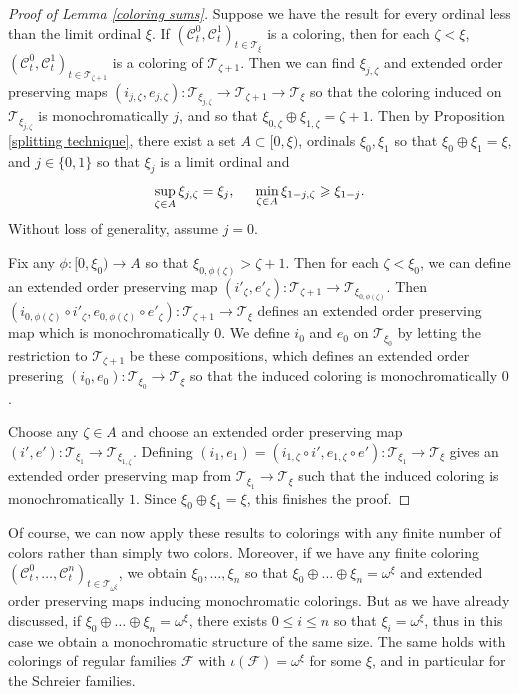 \documentclass[12pt]{amsart}
\theoremstyle{definition}
\newcommand{\ccc}{\mathcal{C}}
\newcommand{\fff}{\mathcal{F}}
\newcommand{\ttt}{\mathcal{T}}
\begin{document}
\begin{proof}[Proof of Lemma \ref{coloring sums}]
Suppose we have the result for every ordinal less than the limit ordinal $\xi$.  If $(\ccc^0_t, \ccc^1_t)_{t\in \ttt_\xi}$ is a coloring, then for each $\zeta<\xi$, $(\ccc^0_t, \ccc^1_t)_{t\in \ttt_{\zeta+1}}$ is a coloring of $\ttt_{\zeta+1}$.  Then we can find $\xi_{j, \zeta}$ and extended order preserving maps $(i_{j, \zeta}, e_{j, \zeta}):\ttt_{\xi_{j, \zeta}}\to \ttt_{\zeta+1}\to \ttt_\xi$ so that the coloring induced on $\ttt_{\xi_{j, \zeta}}$ is monochromatically $j$, and so that $\xi_{0, \zeta}\oplus \xi_{1, \zeta}=\zeta+1$.  Then by Proposition \ref{splitting technique}, there exist a set $A\subset [0, \xi)$, ordinals $\xi_0, \xi_1$ so that $\xi_0\oplus \xi_1=\xi$, and $j\in \{0,1\}$ so that $\xi_j$ is a limit ordinal and $$\sup_{\zeta\in A} \xi_{j, \zeta}=\xi_j, \hspace{5mm} \min_{\zeta\in A}\xi_{1-j, \zeta}\geqslant \xi_{1-j}.$$  Without loss of generality, assume $j=0$.  

Fix any $\phi:[0, \xi_0)\to A$ so that $\xi_{0,\phi(\zeta)}>\zeta+1$.  Then for each $\zeta<\xi_0$, we can define an extended order preserving map $(i'_\zeta, e'_\zeta):\ttt_{\zeta+1}\to \ttt_{\xi_{0,\phi(\zeta)}}$.  Then $(i_{0, \phi(\zeta)}\circ i'_\zeta, e_{0, \phi(\zeta)}\circ e'_\zeta):\ttt_{\zeta+1}\to \ttt_\xi$ defines an extended order preserving map which is monochromatically $0$.  We define $i_0$ and $e_0$ on $\ttt_{\xi_0}$ by letting the restriction to $\ttt_{\zeta+1}$ be these compositions, which defines an extended order presering $(i_0, e_0):\ttt_{\xi_0}\to \ttt_\xi$ so that the induced coloring is monochromatically $0$.  

Choose any $\zeta\in A$ and choose an extended order preserving map $(i', e'):\ttt_{\xi_1}\to \ttt_{\xi_{1,\zeta}}$.  Defining $(i_1, e_1)= ( i_{1, \zeta}\circ i', e_{1, \zeta}\circ e'):\ttt_{\xi_1}\to \ttt_\xi$ gives an extended order preserving map from $\ttt_{\xi_1}\to \ttt_\xi$ such that the induced coloring is monochromatically $1$.  Since $\xi_0\oplus \xi_1=\xi$, this finishes the proof.  




  






\end{proof}





Of course, we can now apply these results to colorings with any finite number of colors rather than simply two colors.  Moreover, if we have any finite coloring $(\ccc^0_t, \ldots, \ccc^n_t)_{t\in \ttt_{\omega^\xi}}$, we obtain $\xi_0, \ldots, \xi_n$ so that $\xi_0\oplus\ldots \oplus \xi_n= \omega^\xi$ and extended order preserving maps inducing monochromatic colorings.  But as we have already discussed, if $\xi_0\oplus \ldots \oplus \xi_n= \omega^\xi$, there exists $0\leqslant i\leqslant n$ so that $\xi_i=\omega^\xi$, thus in this case we obtain a monochromatic structure of the same size.  The same holds with colorings of regular families $\fff$ with $\iota(\fff)=\omega^\xi$ for some $\xi$, and in particular for the Schreier families.  
\end{document}

